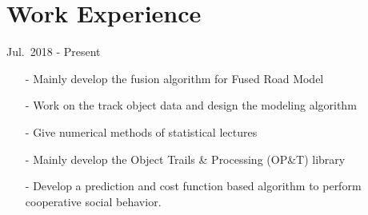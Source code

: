 \documentclass[a4paper,10pt,dvipdfmx]{article}
\begin{document}
\section*{Work Experience}
\hfill Jul.~2018 - Present
\begin{itemize}[noitemsep,nolistsep]
	\item[-] Mainly develop the fusion algorithm for Fused Road Model
	\item[-] Work on the track object data and design the modeling algorithm
	\item[-] Give numerical methods of statistical lectures
  \item[-] Mainly develop the Object Trails \& Processing (OP\&T) library
  \item[-] Develop a prediction and cost function based algorithm to perform cooperative social behavior.\\
\end{itemize}


\end{document}
